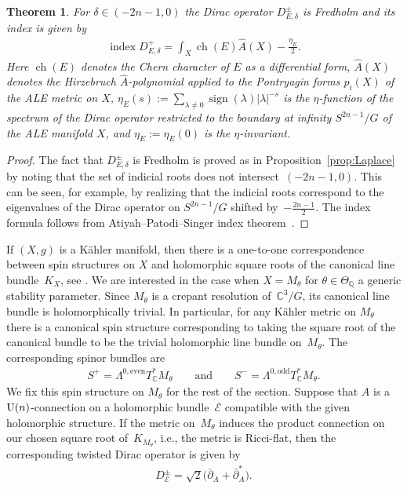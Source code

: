 \documentclass[10pt,a4paper]{amsart}
\numberwithin{equation}{section}
\newcommand{\cE}{\mathcal{E}}
\newcommand{\Q}{{\mathbb Q}}
\newcommand{\C}{{\mathbb C}}
\newcommand{\U}{{\rm U}}
\newcommand{\ch}{\operatorname{ch}}
\newcommand{\delbar}{\bar \del}
\newcommand{\del}{\partial}
\newcommand{\ind}{\mathop{\mathrm{index}}}
\newcommand{\sign}{\operatorname{sign}}
\newtheorem{Theorem}{Theorem}[section]
\begin{document}
\begin{Theorem}
  For $\delta\in(-2n-1,0)$ the Dirac operator $D^\pm_{E,\delta}$ is
  Fredholm and its index is given by
  \begin{gather}\label{eq:index-ale}
    \ind D^{+}_{E,\delta} = \int_X \ch(E) \hat{A}(X) - \frac{\eta_E}{2}.
  \end{gather}
  Here  $\ch(E)$ denotes the Chern character of $E$ as a differential form,
  $\hat{A}(X)$ denotes the Hirzebruch $\hat{A}$-polynomial
  applied to the Pontryagin forms $p_i(X)$ of the ALE metric on $X$,
   $\eta_E(s):=\sum\limits_{\lambda\neq 0}\sign(\lambda) |\lambda|^{-s}$ is
  the $\eta$-function of the spectrum of the Dirac operator restricted to
  the boundary at infinity $S^{2n-1}/G$ of the ALE manifold $X$, and
  $\eta_E:=\eta_E(0)$ is the $\eta$-invariant.
\end{Theorem}

\begin{proof}
  The fact that $D^\pm_{E,\delta}$ is Fredholm is proved as in
  Proposition~\ref{prop:Laplace} by noting that the set of indicial
  roots does not intersect~$(-2n-1, 0)$.  This can be seen, for
  example, by realizing that the indicial roots correspond to the
  eigenvalues of the Dirac operator on $S^{2n-1}/G$ shifted by~$-\frac{2n-1}{2}$.  The index formula follows from
  Atiyah--Patodi--Singer index theorem~\cite{Atiyah1975a}.
\end{proof}

If $(X,g)$ is a K\"ahler manifold, then there is a one-to-one
correspondence between spin structures on $X$ and holomorphic square
roots of the canonical line bundle~$K_X$,
see \cite[Theorem~2.2]{Hitchin1974}. We are interested in the case
when $X = M_{\theta}$ for $\theta \in \Theta_{\Q}$ a generic stability
parameter.  Since $M_\theta$ is a crepant resolution of~$\C^3/G$, its
canonical line bundle is holomorphically trivial.  In par\-ti\-cular, for
any K\"ahler metric on $M_\theta$ there is a canonical spin structure
corresponding to taking the square root of the canonical bundle to be
the trivial holomorphic line bundle on~$M_\theta$. The corresponding
spinor bundles are
\begin{gather*}
  S^{+} = \Lambda^{0,\text{even}} T_\C^*M_\theta \qquad\text{and}\qquad
  S^{-} = \Lambda^{0, \text{odd}} T_\C^*M_\theta.
\end{gather*}
We f\/ix this spin structure on $M_\theta$ for the rest of the section.
Suppose that $A$ is a $\U(n)$-connection on a holomorphic bundle~$\cE$
compatible with the given holomorphic structure.  If the metric on~$M_\theta$ induces the product connection on our chosen square root of~$K_{M_\theta}$,
i.e., the metric is Ricci-f\/lat, then the corresponding twisted Dirac
operator is given by
\begin{gather}\label{eq:D-1}
  D^\pm_{\cE} = \sqrt2 \big(\delbar_A + \delbar_A^*\big).
\end{gather}
\end{document}
